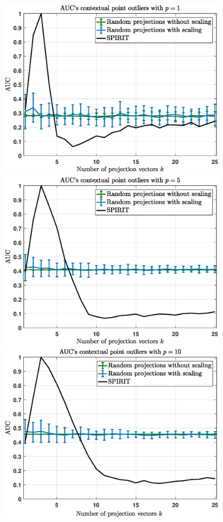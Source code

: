 \begin{figure}[h]
	\centering
	\includegraphics[scale=0.36]{analysis/AUCs_contextual}
	\includegraphics[scale=0.36]{analysis/AUCs_contextual1}
	\includegraphics[scale=0.36]{analysis/AUCs_contextual2}

\end{figure}
